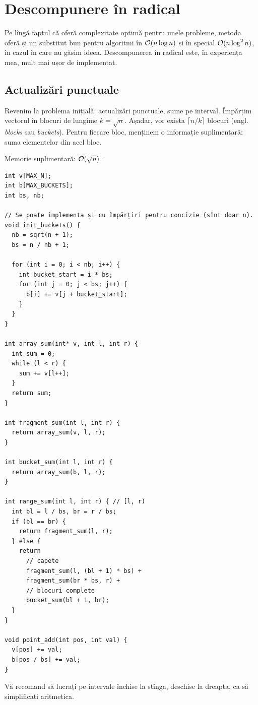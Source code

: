 \documentclass[../main.tex]{subfiles}
\begin{document}
\chapter{Descompunere în radical}

Pe lîngă faptul că oferă complexitate optimă pentru unele probleme, metoda oferă și un substitut bun pentru algoritmi în $\mathcal{O}(n \log n)$ și în special $\mathcal{O}(n \log^2 n)$, în cazul în care nu găsim ideea. Descompunerea în radical este, în experiența mea, mult mai ușor de implementat.

\section{Actualizări punctuale}

Revenim la problema inițială: actualizări punctuale, sume pe interval. Împărțim vectorul în blocuri de lungime $k = \sqrt{n}$. Așadar, vor exista $\lceil n/k \rceil$ blocuri (engl. \textit{blocks} sau \textit{buckets}). Pentru fiecare bloc, menținem o informație suplimentară: suma elementelor din acel bloc.

Memorie suplimentară: $\mathcal{O}(\sqrt{n})$.

\begin{verbatim}
int v[MAX_N];
int b[MAX_BUCKETS];
int bs, nb;

// Se poate implementa și cu împărțiri pentru concizie (sînt doar n).
void init_buckets() {
  nb = sqrt(n + 1);
  bs = n / nb + 1;

  for (int i = 0; i < nb; i++) {
    int bucket_start = i * bs;
    for (int j = 0; j < bs; j++) {
      b[i] += v[j + bucket_start];
    }
  }
}

int array_sum(int* v, int l, int r) {
  int sum = 0;
  while (l < r) {
    sum += v[l++];
  }
  return sum;
}

int fragment_sum(int l, int r) {
  return array_sum(v, l, r);
}

int bucket_sum(int l, int r) {
  return array_sum(b, l, r);
}

int range_sum(int l, int r) { // [l, r)
  int bl = l / bs, br = r / bs;
  if (bl == br) {
    return fragment_sum(l, r);
  } else {
    return
      // capete
      fragment_sum(l, (bl + 1) * bs) +
      fragment_sum(br * bs, r) +
      // blocuri complete
      bucket_sum(bl + 1, br);
  }
}

void point_add(int pos, int val) {
  v[pos] += val;
  b[pos / bs] += val;
}
\end{verbatim}

Vă recomand să lucrați pe intervale închise la stînga, deschise la dreapta, ca să simplificați aritmetica.
\end{document}
